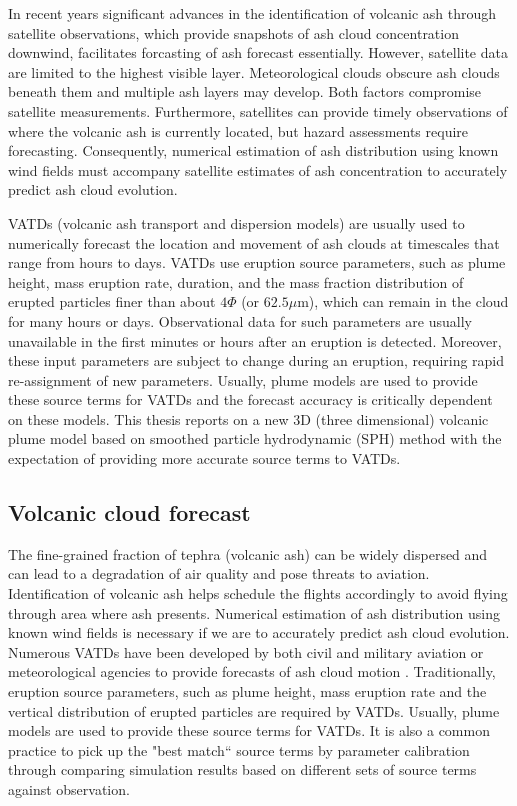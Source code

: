 In recent years significant advances in
the identification of volcanic ash through satellite observations, which provide snapshots of ash cloud concentration downwind, facilitates forcasting of ash forecast essentially.
However, satellite data are limited to the highest visible layer. Meteorological clouds obscure ash clouds beneath them and multiple ash layers may develop. Both factors compromise satellite measurements.
Furthermore, satellites can provide timely observations of
where the volcanic ash is currently located, but hazard assessments
require forecasting. Consequently, numerical estimation
of ash distribution using known wind fields must
accompany satellite estimates of ash concentration to accurately predict ash cloud evolution.

VATDs (volcanic ash transport and dispersion models) are usually used to numerically forecast the location and movement of ash clouds at timescales that range from hours to days. VATDs use eruption source parameters, such as plume height, mass eruption rate, duration, and the mass fraction distribution of erupted particles finer than about $4 \Phi$ (or $62.5 \mu$m), which can remain in the cloud for many hours or days. Observational data for such parameters are usually unavailable in the first minutes or hours after an eruption is detected. Moreover, these input parameters are subject to change during an eruption, requiring rapid re-assignment of new parameters. Usually, plume models are used to provide these source terms for VATDs and the forecast accuracy is critically dependent on these models. This thesis reports on a new 3D (three dimensional) volcanic plume model based on smoothed particle hydrodynamic (SPH) method with the expectation of providing more accurate source terms to VATDs.

\subsection{Volcanic cloud forecast}

The fine-grained fraction of tephra (volcanic ash) can be widely dispersed and can lead to a degradation of air quality and pose threats to aviation. Identification of volcanic ash helps schedule the flights accordingly to avoid flying through area where ash presents. Numerical estimation of ash distribution using known wind fields is necessary if we are to accurately predict ash cloud evolution. Numerous VATDs have been developed by both civil and military aviation or meteorological agencies to provide forecasts of ash cloud motion \citep{witham2007comparison}. Traditionally, eruption source parameters, such as plume height, mass eruption rate and the vertical distribution of erupted particles are required by VATDs. Usually, plume models are used to provide these source terms for VATDs. It is also a common practice to pick up the "best match`` source terms by parameter calibration through comparing simulation results based on different sets of source terms against observation. 

